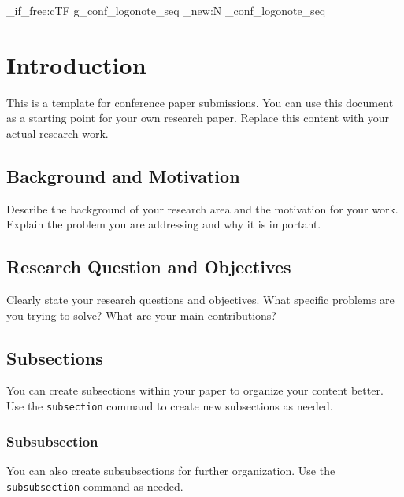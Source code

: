 \documentclass[
hf,
]{confart}
\begin{document}
\ExplSyntaxOn
\cs_if_free:cTF { g_conf_logonote_seq } { \seq_new:N \g_conf_logonote_seq } { }
\ExplSyntaxOff

\maketitle

\section{Introduction}

This is a template for conference paper submissions. You can use this document as a starting point for your own research paper. Replace this content with your actual research work.

\subsection{Background and Motivation}

Describe the background of your research area and the motivation for your work. Explain the problem you are addressing and why it is important.

\subsection{Research Question and Objectives}

Clearly state your research questions and objectives. What specific problems are you trying to solve? What are your main contributions?

\subsection{Subsections}

You can create subsections within your paper to organize your content better. Use the \texttt{subsection} command to create new subsections as needed.

\subsubsection{Subsubsection}
You can also create subsubsections for further organization. Use the \texttt{subsubsection} command as needed.
\end{document}
